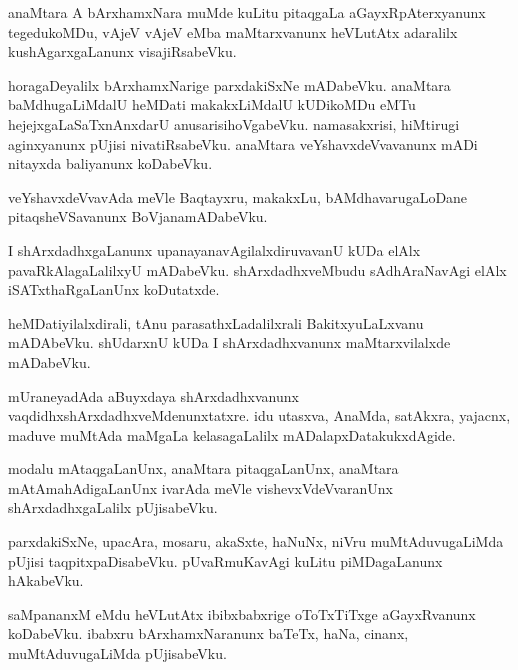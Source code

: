\documentclass{article}
\begin{document}
\begin{mn}
anaMtara A bArxhamxNara muMde kuLitu pitaqgaLa aGayxRpAterxyanunx
tegedukoMDu, vAjeV vAjeV eMba maMtarxvanunx heVLutAtx adaralilx
kushAgarxgaLanunx visajiRsabeVku.
\end{mn}

\begin{mn}%
horagaDeyalilx bArxhamxNarige parxdakiSxNe mADabeVku. anaMtara
baMdhugaLiMdalU heMDati makakxLiMdalU kUDikoMDu eMTu
hejejxgaLaSaTxnAnxdarU anusarisihoVgabeVku. namasakxrisi, hiMtirugi
aginxyanunx pUjisi nivatiRsabeVku. anaMtara veYshavxdeVvavanunx mADi
nitayxda baliyanunx koDabeVku.
\end{mn}

\begin{mn}
veYshavxdeVvavAda meVle Baqtayxru, makakxLu, bAMdhavarugaLoDane
pitaqsheVSavanunx BoVjanamADabeVku.
\end{mn}

\begin{mn}
I shArxdadhxgaLanunx upanayanavAgilalxdiruvavanU kUDa elAlx
pavaRkAlagaLalilxyU mADabeVku. shArxdadhxveMbudu sAdhAraNavAgi elAlx
iSATxthaRgaLanUnx koDutatxde.
\end{mn}

\begin{mn}
heMDatiyilalxdirali, tAnu parasathxLadalilxrali BakitxyuLaLxvanu
mADAbeVku. shUdarxnU kUDa I shArxdadhxvanunx maMtarxvilalxde mADabeVku.
\end{mn}

\begin{mn}
mUraneyadAda aBuyxdaya shArxdadhxvanunx
vaqdidhxshArxdadhxveMdenunxtatxre. idu utasxva, AnaMda, satAkxra,
yajacnx, maduve muMtAda maMgaLa kelasagaLalilx mADalapxDatakukxdAgide.
\end{mn}

\begin{mn}
modalu mAtaqgaLanUnx, anaMtara pitaqgaLanUnx, anaMtara
mAtAmahAdigaLanUnx ivarAda meVle vishevxVdeVvaranUnx
shArxdadhxgaLalilx pUjisabeVku.
\end{mn}

\begin{mn}%
parxdakiSxNe, upacAra, mosaru, akaSxte, haNuNx, niVru muMtAduvugaLiMda
pUjisi taqpitxpaDisabeVku. pUvaRmuKavAgi kuLitu piMDagaLanunx hAkabeVku.
\end{mn}

\begin{mn}
saMpananxM eMdu heVLutAtx ibibxbabxrige oToTxTiTxge aGayxRvanunx
koDabeVku. ibabxru bArxhamxNaranunx baTeTx, haNa, cinanx,
muMtAduvugaLiMda pUjisabeVku.
\end{mn}
\end{document}
